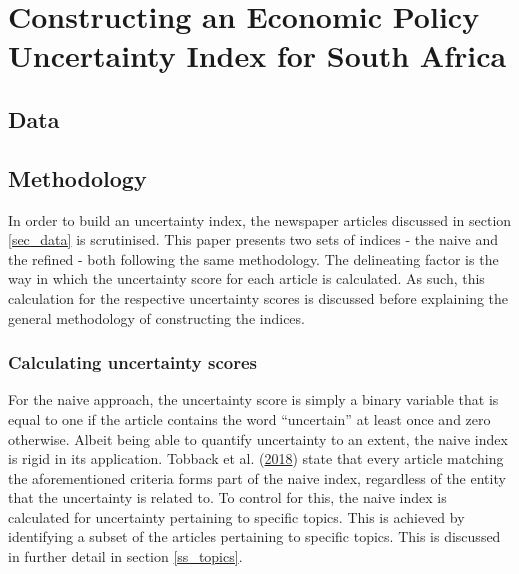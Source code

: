 \documentclass[11pt,preprint, authoryear]{elsarticle}
\numberwithin{equation}{section}
\numberwithin{figure}{section}
\numberwithin{table}{section}
\begin{document}
\section{\texorpdfstring{Constructing an Economic Policy Uncertainty
Index for South Africa
\label{sec_EPU}}{Constructing an Economic Policy Uncertainty Index for South Africa }}\label{constructing-an-economic-policy-uncertainty-index-for-south-africa}

\subsection{\texorpdfstring{Data \label{sec_data}}{Data }}\label{data}

\subsection{\texorpdfstring{Methodology
\label{sec_method}}{Methodology }}\label{methodology}

In order to build an uncertainty index, the newspaper articles discussed
in section \ref{sec_data} is scrutinised. This paper presents two sets
of indices - the naive and the refined - both following the same
methodology. The delineating factor is the way in which the uncertainty
score for each article is calculated. As such, this calculation for the
respective uncertainty scores is discussed before explaining the general
methodology of constructing the indices.

\subsubsection{\texorpdfstring{Calculating uncertainty scores
\label{ss_uncertaintyscore}}{Calculating uncertainty scores }}\label{calculating-uncertainty-scores}

For the naive approach, the uncertainty score is simply a binary
variable that is equal to one if the article contains the word
``uncertain'' at least once and zero otherwise. Albeit being able to
quantify uncertainty to an extent, the naive index is rigid in its
application. Tobback et al. (\protect\hyperlink{ref-Tobback2018}{2018})
state that every article matching the aforementioned criteria forms part
of the naive index, regardless of the entity that the uncertainty is
related to. To control for this, the naive index is calculated for
uncertainty pertaining to specific topics. This is achieved by
identifying a subset of the articles pertaining to specific topics. This
is discussed in further detail in section \ref{ss_topics}.
\end{document}
